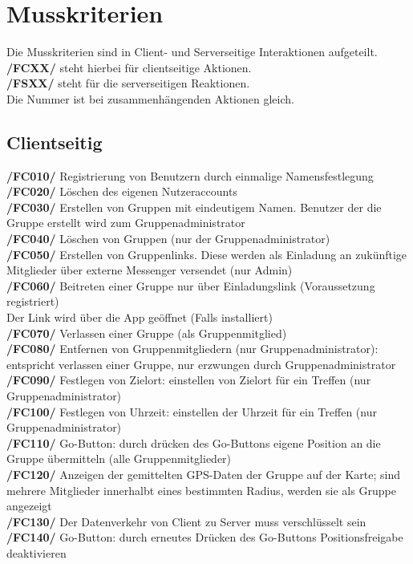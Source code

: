 \newpage
\section{Musskriterien}
Die Musskriterien sind in Client- und Serverseitige Interaktionen aufgeteilt.\\
\textbf{/FCXX/} steht hierbei für clientseitige Aktionen.\\
\textbf{/FSXX/} steht für die serverseitigen Reaktionen.\\
Die Nummer ist bei zusammenhängenden Aktionen gleich.\\
\subsection{Clientseitig}
     \textbf{/FC010/} Registrierung von Benutzern durch einmalige Namensfestlegung\\
     \textbf{/FC020/} Löschen des eigenen Nutzeraccounts\\
     \textbf{/FC030/} Erstellen von Gruppen mit eindeutigem Namen. Benutzer der die Gruppe erstellt wird zum Gruppenadministrator\\
     \textbf{/FC040/} Löschen von Gruppen (nur der Gruppenadministrator)   \\
     \textbf{/FC050/} Erstellen von Gruppenlinks. Diese werden als Einladung an zukünftige Mitglieder über externe Messenger versendet (nur Admin)\\
     \textbf{/FC060/} Beitreten einer Gruppe nur über Einladungslink (Voraussetzung registriert) \\
     Der Link wird über die App geöffnet (Falls installiert) \\
     \textbf{/FC070/} Verlassen einer Gruppe (als Gruppenmitglied)\\
     \textbf{/FC080/} Entfernen von Gruppenmitgliedern (nur Gruppenadministrator): entspricht verlassen einer Gruppe, nur erzwungen durch Gruppenadministrator\\
     \textbf{/FC090/} Festlegen von Zielort: einstellen von Zielort für ein Treffen (nur Gruppenadministrator)\\
     \textbf{/FC100/} Festlegen von Uhrzeit: einstellen der Uhrzeit für ein Treffen (nur Gruppenadministrator) \\
     \textbf{/FC110/} Go-Button: durch drücken des Go-Buttons eigene Position an die Gruppe übermitteln (alle Gruppenmitglieder)\\
     \textbf{/FC120/} Anzeigen der gemittelten GPS-Daten der Gruppe auf der Karte; sind mehrere Mitglieder innerhalbt eines bestimmten Radius,
     werden sie als Gruppe angezeigt\\
     \textbf{/FC130/} Der Datenverkehr von Client zu Server muss verschlüsselt sein\\
     \textbf{/FC140/} Go-Button: durch erneutes Drücken des Go-Buttons Positionsfreigabe deaktivieren\\
